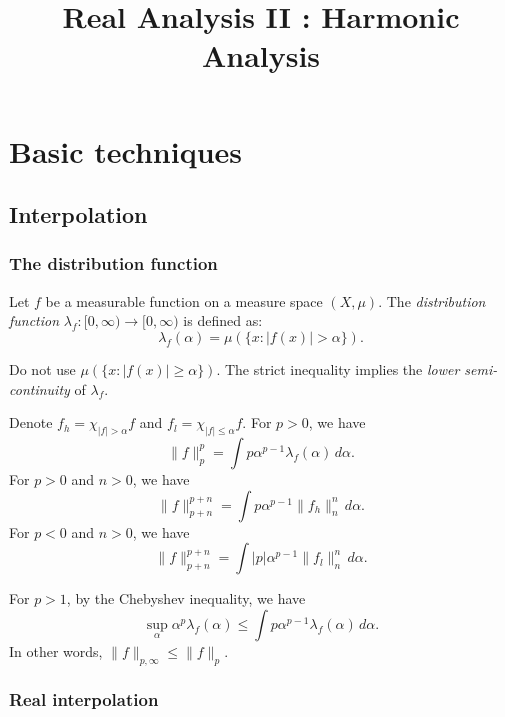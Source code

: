 \documentclass{../crs}
\title{Real Analysis II : Harmonic Analysis}
\begin{document}
\maketitle
\tableofcontents

\chapter{Basic techniques}




\section{Interpolation}



\subsection{The distribution function}
\begin{defn}
Let $f$ be a measurable function on a measure space $(X,\mu)$.
The \emph{distribution function} $\lambda_f:[0,\infty)\to [0,\infty)$ is defined as:
\[\lambda_f(\alpha)=\mu(\{x:|f(x)|>\alpha\}).\]
\end{defn}


Do not use $\mu(\{x:|f(x)|\ge\alpha\})$.
The strict inequality implies the \emph{lower semi-continuity} of $\lambda_f$.

\begin{thm}[Fubini]
Denote $f_h=\chi_{|f|>\alpha}f$ and $f_l=\chi_{|f|\le\alpha}f$.
For $p>0$, we have
\[\|f\|_p^p=\int p\alpha^{p-1}\lambda_f(\alpha)\,d\alpha.\]
For $p>0$ and $n>0$, we have
\[\|f\|_{p+n}^{p+n}=\int p\alpha^{p-1}\|f_h\|_n^n\,d\alpha.\]
For $p<0$ and $n>0$, we have
\[\|f\|_{p+n}^{p+n}=\int |p|\alpha^{p-1}\|f_l\|_n^n\,d\alpha.\]
\end{thm}
\begin{thm}
For $p>1$, by the Chebyshev inequality, we have
\[\sup_\alpha\alpha^p\lambda_f(\alpha)\le\int p\alpha^{p-1}\lambda_f(\alpha)\,d\alpha.\]
In other words, $\|f\|_{p,\infty}\le\|f\|_p$.
\end{thm}





\subsection{Real interpolation}
\end{document}
